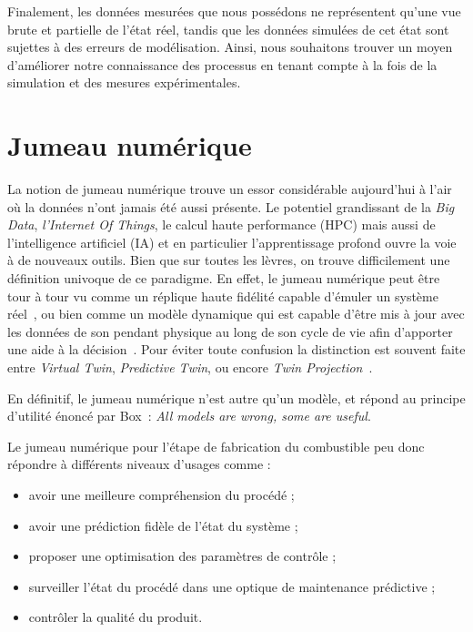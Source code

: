 Finalement, les données mesurées que nous possédons ne représentent qu'une vue brute et partielle de l'état réel, tandis que les données simulées de cet état sont sujettes à des erreurs de modélisation. Ainsi, nous souhaitons trouver un moyen d'améliorer notre connaissance des processus en tenant compte à la fois de la simulation et des mesures expérimentales.

\section{Jumeau numérique}

La notion de jumeau numérique trouve un essor considérable aujourd'hui à l'air où la données n'ont jamais été aussi présente. Le potentiel grandissant de la \textit{Big Data}, \textit{l'Internet Of Things}, le calcul haute performance (HPC) mais aussi de l'intelligence artificiel (IA) et en particulier l'apprentissage profond ouvre la voie à de nouveaux outils. Bien que sur toutes les lèvres, on trouve difficilement une définition univoque de ce paradigme.
En effet, le jumeau numérique peut être tour à tour vu comme un réplique haute fidélité capable d'émuler un système réel~\cite{noauthor_digital_nodate}, ou bien comme un modèle dynamique qui est capable d'être mis à jour avec les données de son pendant physique au long de son cycle de vie afin d'apporter une aide à la décision~\cite{AIAA2020}. Pour éviter toute confusion la distinction est souvent faite entre \textit{Virtual Twin}, \textit{Predictive Twin}, ou encore \textit{Twin Projection}~\cite{Kvamsdal}.

En définitif, le jumeau numérique n'est autre qu'un modèle, et répond au principe d'utilité énoncé par Box~\cite{box1979}: \textit{All models are wrong, some are useful}.

Le jumeau numérique pour l'étape de fabrication du combustible peu donc répondre à différents niveaux d'usages comme :
\begin{itemize}
    \item avoir une meilleure compréhension du procédé ;
    \item avoir une prédiction fidèle de l'état du système ;
    \item proposer une optimisation des paramètres de contrôle ;
    \item surveiller l'état du procédé dans une optique de maintenance prédictive ;
    \item contrôler la qualité du produit.
\end{itemize}

